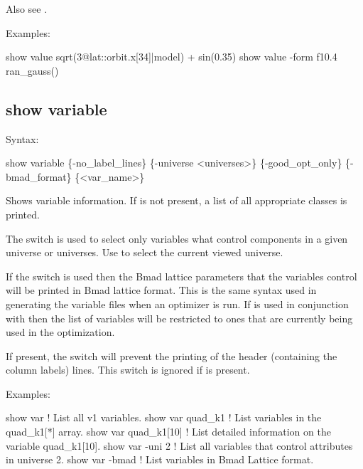 {{{{{{{{{Also see . 

Examples:
\begin{example}
  show value sqrt(3@lat::orbit.x[34]|model) + sin(0.35)
  show value -form f10.4 ran_gauss()
\end{example}



\subsection{show variable}
\label{s:show.variable}

Syntax:
\begin{example}
  show variable \{-no_label_lines\} \{-universe <universes>\}            
         \{-good_opt_only\} \{-bmad_format\} \{<var_name>\}
\end{example}


Shows variable information. If  is not present, a list of all appropriate
 classes is printed.

The  switch is used to select only variables what control components in a
given universe or universes. Use  to select the current viewed universe.

If the  switch is used then the Bmad lattice parameters that the \tao
variables control will be printed in Bmad lattice format. This is the same syntax used in
generating the variable files when an optimizer is run. If  is used in
conjunction with  then the list of variables will be restricted to ones
that are currently being used in the optimization.

If present, the  switch will prevent the printing of the header
(containing the column labels) lines. This switch is ignored if  is present.

Examples:
\begin{example}
  show var             ! List all v1 variables.
  show var quad_k1     ! List variables in the quad_k1[*] array.
  show var quad_k1[10] ! List detailed information on the variable quad_k1[10].
  show var -uni 2      ! List all variables that control attributes in universe 2.
  show var -bmad       ! List variables in Bmad Lattice format.
\end{example}


}}}}}}}}}
